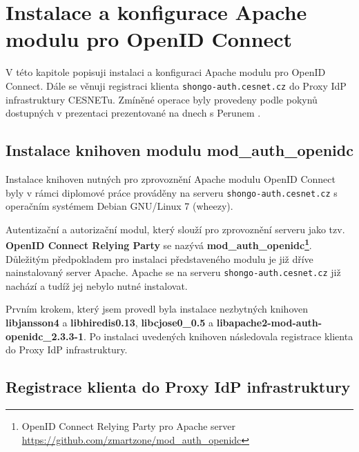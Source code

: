 \documentclass[
  printed, %
  twoside, %
  table,   %
  nolof,     %
  nolot,     %
]{fithesis3}
\begin{document}
\section{Instalace a konfigurace Apache modulu pro OpenID Connect}
\label{apacheInstall}
V této kapitole popisuji instalaci a konfiguraci Apache modulu pro OpenID Connect. Dále se věnuji registraci klienta \texttt{shongo-auth.cesnet.cz} do Proxy IdP infrastruktury CESNETu. Zmíněné operace byly provedeny podle pokynů dostupných v prezentaci prezentované na dnech s Perunem \cite{oidcConfigPresentation}.

\label{apacheConfig}
\subsection{Instalace knihoven modulu mod\_auth\_openidc}
Instalace knihoven nutných pro zprovoznění Apache modulu OpenID Connect byly v rámci diplomové práce prováděny na serveru \texttt{shongo-auth.cesnet.cz} s operačním systémem Debian GNU/Linux 7 (wheezy). 
\par 
Autentizační a autorizační modul, který slouží pro zprovoznění serveru jako tzv. \textbf{OpenID Connect Relying Party} se nazývá \textbf{mod\_auth\_openidc\footnote{OpenID Connect Relying Party pro Apache server \url{https://github.com/zmartzone/mod\_auth\_openidc}}}. Důležitým předpokladem pro instalaci představeného modulu je již dříve nainstalovaný server Apache. Apache se na serveru \texttt{shongo-auth.cesnet.cz} již nachází a tudíž jej nebylo nutné instalovat. 
\par 
Prvním krokem, který jsem provedl byla instalace nezbytných knihoven \textbf{libjansson4} a \textbf{libhiredis0.13}, \textbf{libcjose0\_0.5} a \textbf{libapache2-mod-auth-openidc\_2.3.3-1}. Po instalaci uvedených knihoven následovala registrace klienta do Proxy IdP infrastruktury. 

\subsection{Registrace klienta do Proxy IdP infrastruktury}
\end{document}
